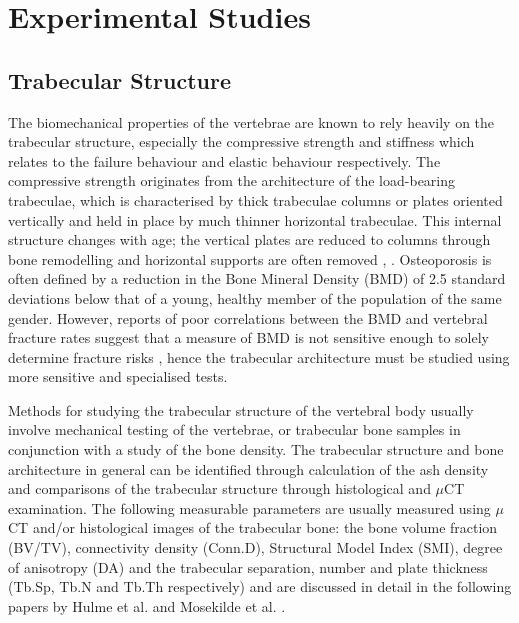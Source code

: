 \section{Experimental Studies}\label{experimental-studies}

\subsection{Trabecular Structure }\label{trabecular-structure}

The biomechanical properties of the vertebrae are known to rely heavily
on the trabecular structure, especially the compressive strength and
stiffness which relates to the failure behaviour and elastic behaviour
respectively. The compressive strength originates from the architecture
of the load-bearing trabeculae, which is characterised by thick
trabeculae columns or plates oriented vertically and held in place by
much thinner horizontal trabeculae. This internal structure changes with
age; the vertical plates are reduced to columns through bone remodelling
and horizontal supports are often removed \cite{atkinson1967variation},
\cite{parfitt1984age}.
Osteoporosis is often defined by a reduction in the Bone Mineral Density
(BMD) of 2.5 standard deviations below that of a young, healthy member
of the population of the same gender. However, reports of poor
correlations between the BMD and vertebral fracture rates suggest that a
measure of BMD is not sensitive enough to solely determine fracture
risks \cite{Aaron2000}, hence the trabecular architecture must be studied using
more sensitive and specialised tests.

Methods for studying the trabecular structure of the vertebral body
usually involve mechanical testing of the vertebrae, or trabecular bone
samples in conjunction with a study of the bone density. The trabecular
structure and bone architecture in general can be identified through
calculation of the ash density and comparisons of the trabecular
structure through histological and $\mu$CT examination. The following
measurable parameters are usually measured using $\mu$CT and/or histological
images of the trabecular bone: the bone volume fraction (BV/TV),
connectivity density (Conn.D), Structural Model Index (SMI), degree of
anisotropy (DA) and the trabecular separation, number and plate
thickness (Tb.Sp, Tb.N and Tb.Th respectively) and are discussed in
detail in the following papers by Hulme et al. \cite{hulme2007regional} and Mosekilde et al.
\cite{mosekilde1987biomechanical}.

